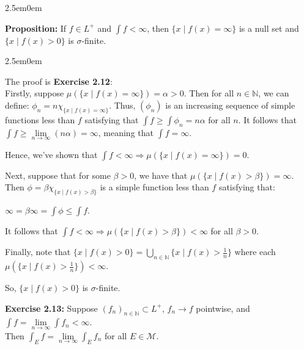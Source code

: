 \documentclass{book}
\newcommand{\hTwo}{%
\color{MidnightBlue}%
   \fontsize{13}{15}\selectfont%
}
\newcommand{\exOne}{%
   \color{Purple}%
   \fontsize{13}{15}\selectfont%
}
\newcommand{\exTwo}{%
   \color{Purple}%
   \fontsize{13}{15}\selectfont%
}
\newcommand{\exTwoP}{%
   \color{RedViolet}%
   \fontsize{13}{15}\selectfont%
}
\newenvironment{myIndent}{%
   \begin{adjustwidth}{2.5em}{0em}%
}{%
   \end{adjustwidth}%
}
\newcommand{\blab}[1]{\textbf{#1}}
\newcommand{\retTwo}{\hfill\bigbreak}
\begin{document}

\begin{myIndent}\hTwo 
   \blab{Proposition:} If $f \in L^+$ and $\int f < \infty$, then $\{x \mid f(x) = \infty\}$ is a null set and\\ $\{x \mid f(x) > 0\}$ is $\sigma$-finite.
   \begin{myIndent}\exTwo
      The proof is \blab{Exercise 2.12}:\exTwoP\\
      Firstly, suppose $\mu(\{x \mid f(x) = \infty\}) = \alpha > 0$. Then for all $n \in \mathbb{N}$, we can\\ define: $\phi_n = n\chi_{\{x \mid f(x) = \infty\}}$. Thus, $(\phi_n)$ is an increasing sequence of simple functions less than $f$ satisfying that $\int f \geq \int \phi_n = n\alpha$ for all $n$. It follows that $\int f \geq \lim\limits_{n \rightarrow \infty} (n\alpha) = \infty$, meaning that $\int f = \infty$.\retTwo
      
      Hence, we've shown that $\int f < \infty \Longrightarrow \mu(\{x \mid f(x) = \infty\}) = 0$.\retTwo

      Next, suppose that for some $\beta > 0$, we have that $\mu(\{x \mid f(x) > \beta\}) = \infty$. Then $\phi = \beta \chi_{\{x \mid f(x) > \beta\}}$ is a simple function less than $f$ satisfying that:
       
      {\centering $\infty = \beta\infty = \int \phi \leq \int f$.\retTwo\par}

      It follows that $\int f < \infty \Longrightarrow \mu(\{x \mid f(x) > \beta\}) < \infty$ for all $\beta > 0$.\retTwo

      Finally, note that $\{x \mid f(x) > 0\} = \bigcup\limits_{n \in \mathbb{N}}\{x \mid f(x) > \frac{1}{n}\}$ where each\\ [-8pt] $\mu(\{x \mid f(x) > \frac{1}{n}\}) < \infty$.\retTwo

      So, $\{x \mid f(x) > 0\}$ is $\sigma$-finite.\retTwo
   \end{myIndent}
\end{myIndent}


\retTwo


\exOne
\blab{Exercise 2.13:} Suppose $(f_n)_{n \in \mathbb{N}} \subset L^+$, $f_n \rightarrow f$ pointwise, and $\int f = \lim\limits_{n \rightarrow \infty} \int f_n < \infty$.\\ [-3pt] Then $\int_E f = \lim\limits_{n \rightarrow \infty} \int_E f_n$ for all $E \in \mathcal{M}$.\\ [-8pt]
\end{document}
